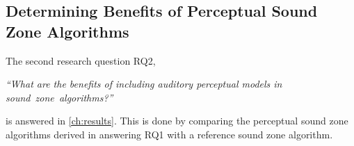 \subsection{Determining Benefits of Perceptual Sound Zone Algorithms}
The second research question RQ2, 

\begin{center}
    {\textit{``What are the benefits of including auditory perceptual models in sound~zone~algorithms?''}}
\end{center}

is answered in \autoref{ch:results}.
This is done by comparing the perceptual sound zone algorithms derived in answering RQ1 with a reference sound zone algorithm.

